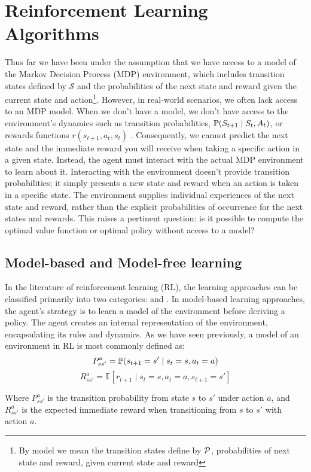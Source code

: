 \section{Reinforcement Learning Algorithms}\label{Algo}



Thus far we have been under the assumption that we have access to a model of the Markov Decision Process (MDP) environment, which includes transition states defined by $\mathcal{S}$ and the probabilities of the next state and reward given the current state and action\footnote{By model we mean the transition states define by $\mathcal P$, probabilities of next state and reward, given current state and reward}.
However, in real-world scenarios, we often lack access to an MDP model. 
When we don't have a model, we don't have access to the environment's dynamics such as transition probabilities, $\mathbb P(S_{t+1} \mid S_t , A_t)$, or rewards functions $r(s_{t+1}, a_t, s_t)$ . Consequently, we cannot predict the next state and the immediate reward you will receive when taking a specific action in a given state. 
Instead, the agent must interact with the actual MDP environment to learn about it. Interacting with the environment doesn't provide transition probabilities; it simply presents a new state and reward when an action is taken in a specific state. The environment supplies individual experiences of the next state and reward, rather than the explicit probabilities of occurrence for the next states and rewards. This raises a pertinent question: is it possible to compute the optimal value function or optimal policy without access to a model?

\subsection{Model-based and Model-free learning}
In the literature of reinforcement learning (RL), the learning approaches can be classified primarily into two categories:  and  \cite{RL3}. In model-based learning approaches, the agent's strategy is to learn a model of the environment before deriving a policy. The agent creates an internal representation of the environment, encapsulating its rules and dynamics. As we have seen previously, a model of an environment in RL is most commonly defined as:
\[
P_{ss'}^{a} = \mathbb P(s_{t+1}=s' \mid s_t=s, a_t=a)
\]
\[R_{ss'}^{a} = \mathbb{E}[r_{t+1} \mid s_t=s, a_t=a, s_{t+1}=s']
\]

Where $P_{ss'}^{a}$ is the transition probability from state $s$ to $s'$ under action $a$, and $R_{ss'}^{a}$ is the expected immediate reward when transitioning from $s$ to $s'$ with action $a$.

